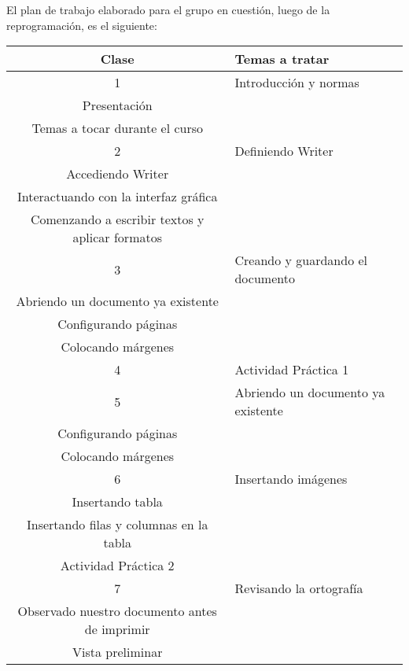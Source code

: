             El plan de trabajo elaborado para el grupo en cuestión, luego de la reprogramación, es el siguiente:
			\begin{center}
                
		
            \begin{tabular}{|c|p{10cm}|}
						\hline
                        \textbf{Clase} & \textbf{Temas a tratar} 
                        \\ \hline
                        1 & \raggedright Introducción y normas
                        \\ Presentación
                        \\ Temas a tocar durante el curso
                        \tabularnewline \hline
                        2 & \raggedright Definiendo Writer
                        \\ Accediendo Writer
                        \\ Interactuando con la interfaz gráfica
                        \\ Comenzando a escribir textos y aplicar formatos
                        \tabularnewline \hline
                        3 & \raggedright Creando y guardando el documento 
                        \\ Abriendo un documento ya existente
                        \\ Configurando páginas
                        \\ Colocando márgenes
                        \tabularnewline \hline
                        
                        4 & \raggedright Actividad Práctica 1
                        \tabularnewline \hline
                        
                        5 & \raggedright Abriendo un documento ya existente
                        \\ Configurando páginas
                        \\ Colocando márgenes
                        \tabularnewline \hline

                        6 & \raggedright Insertando imágenes
                        \\ Insertando tabla
                        \\ Insertando filas y columnas en la tabla
                        \\ Actividad Práctica 2
                        \tabularnewline \hline   
                    
                        7 & \raggedright Revisando la ortografía
                        \\ Observado nuestro documento antes de imprimir
                        \\ Vista preliminar
                        \tabularnewline \hline
                         

\end{tabular}
\end{center}
